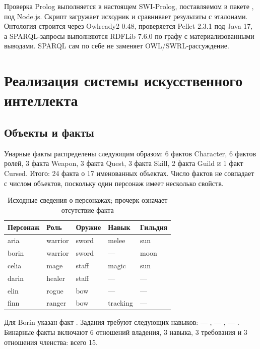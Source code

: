 Проверка Prolog выполняется в настоящем SWI-Prolog, поставляемом в пакете , под Node.js. Скрипт  загружает исходник и сравнивает результаты с эталонами. Онтология строится через Owlready2 0.48, проверяется Pellet 2.3.1 под Java 17, а SPARQL-запросы выполняются RDFLib 7.6.0 по графу с материализованными выводами. SPARQL сам по себе не заменяет OWL/SWRL-рассуждение.

\section{Реализация системы искусственного интеллекта}
\subsection{Объекты и факты}
Унарные факты распределены следующим образом: 6 фактов Character, 6 фактов ролей, 3 факта Weapon, 3 факта Quest, 3 факта Skill, 2 факта Guild и 1 факт Cursed. Итого: 24 факта о 17 именованных объектах. Число фактов не совпадает с числом объектов, поскольку один персонаж имеет несколько свойств.

\begin{table}[ht]
\centering\small
\begin{tabularx}{\textwidth}{@{}lXXXX@{}}
\toprule
Персонаж & Роль & Оружие & Навык & Гильдия\\
\midrule
aria & warrior & sword & melee & sun\\
borin & warrior & sword & --- & moon\\
celia & mage & staff & magic & sun\\
darin & healer & staff & --- & ---\\
elin & rogue & bow & --- & ---\\
finn & ranger & bow & tracking & ---\\
\bottomrule
\end{tabularx}
\caption{Исходные сведения о персонажах; прочерк означает отсутствие факта}
\end{table}
Для Borin указан факт . Задания требуют следующих навыков:  --- ,  --- ,  --- . Бинарные факты включают 6 отношений владения, 3 навыка, 3 требования и 3 отношения членства: всего 15.

